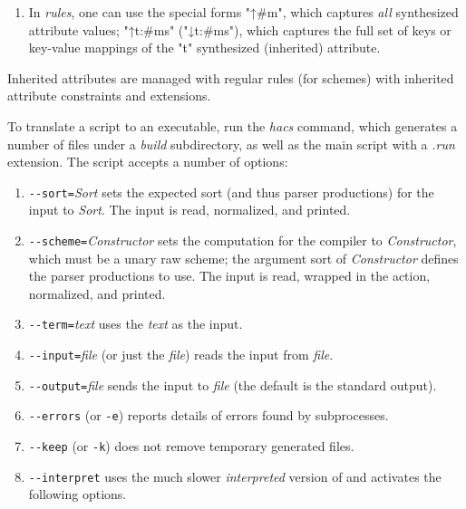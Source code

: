 \documentclass[11pt]{article} %
\begin{document}
\begin{manual}
\begin{enumerate}
  \item In \emph{rules}, one can use the special forms "↑#m", which captures \emph{all} synthesized
    attribute values; "↑t{:#ms}" ("↓t{:#ms}"), which captures the full set of keys or key-value
    mappings of the "t" synthesized (inherited) attribute.

  \end{enumerate}
  Inherited attributes are managed with regular rules (for schemes) with inherited attribute
  constraints and extensions.
\end{manual}

\begin{manual}\label{man:run}\leavevmode
  To translate a \HAX script to an executable, run the \emph{hacs} command, which generates a number
  of files under a \emph{build} subdirectory, as well as the main script with a \emph{.run}
  extension.  The script accepts a number of options:
  \begin{enumerate}

  \item \verb"--sort="\emph{Sort} sets the expected sort (and thus parser productions) for the input to
    \emph{Sort}. The input is read, normalized, and printed.

  \item \verb"--scheme="\emph{Constructor} sets the computation for the compiler to \emph{Constructor},
    which must be a unary raw scheme; the argument sort of \emph{Constructor} defines the parser
    productions to use.  The input is read, wrapped in the action, normalized, and printed.

  \item \verb"--term="\emph{text} uses the \emph{text} as the input.

  \item \verb"--input="\emph{file} (or just the \emph{file}) reads the input from \emph{file}.

  \item \verb"--output="\emph{file} sends the input to \emph{file} (the default is the standard output).

  \item \verb"--errors" (or \verb'-e') reports details of errors found by subprocesses.

  \item \verb"--keep" (or \verb'-k') does not remove temporary generated files.

  \item \verb"--interpret" uses the much slower \emph{interpreted} version of \HAX and activates the
    following options.


\end{enumerate}
\end{manual}
\end{document}
